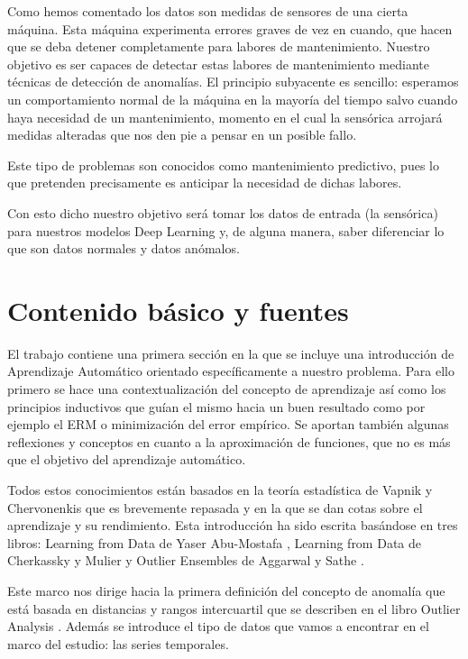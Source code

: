 Como hemos comentado los datos son medidas de sensores de una cierta máquina. Esta máquina experimenta errores graves de vez en cuando, que hacen que se deba detener completamente para labores de mantenimiento. Nuestro objetivo es ser capaces de detectar estas labores de mantenimiento mediante técnicas de detección de anomalías. El principio subyacente es sencillo: esperamos un comportamiento normal de la máquina en la mayoría del tiempo salvo cuando haya necesidad de un mantenimiento, momento en el cual la sensórica arrojará medidas alteradas que nos den pie a pensar en un posible fallo.

Este tipo de problemas son conocidos como mantenimiento predictivo, pues lo que pretenden precisamente es anticipar la necesidad de dichas labores.

Con esto dicho nuestro objetivo será tomar los datos de entrada (la sensórica) para nuestros modelos Deep Learning y, de alguna manera, saber diferenciar lo que son datos normales y datos anómalos.

\section{Contenido básico y fuentes}


El trabajo contiene una primera sección en la que se incluye una introducción de Aprendizaje Automático orientado específicamente a nuestro problema. Para ello primero se hace una contextualización del concepto de aprendizaje así como los principios inductivos que guían el mismo hacia un buen resultado como por ejemplo el ERM o minimización del error empírico. Se aportan también algunas reflexiones y conceptos en cuanto a la aproximación de funciones, que no es más que el objetivo del aprendizaje automático. 

Todos estos conocimientos están basados en la teoría estadística de Vapnik y Chervonenkis que es brevemente repasada y en la que se dan cotas sobre el aprendizaje y su rendimiento. Esta introducción ha sido escrita basándose en tres libros: Learning from Data de Yaser Abu-Mostafa \cite{yaser_learning_2012}, Learning from Data de Cherkassky y Mulier \cite{cherkassky_learning_2007}  y Outlier Ensembles de Aggarwal y Sathe \cite{aggarwal_outlier_2017}.

Este marco nos dirige hacia la primera definición del concepto de anomalía que está basada en distancias y rangos intercuartil que se describen en el libro Outlier Analysis \cite{aggarwal_outlier_2017-1}. Además se introduce el tipo de datos que vamos a encontrar en el marco del estudio: las series temporales.

